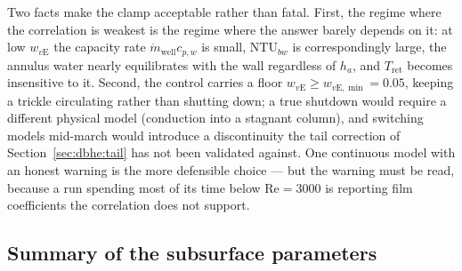 Two facts make the clamp acceptable rather than fatal. First, the regime where
the correlation is weakest is the regime where the answer barely depends on it:
at low $w_{v\mathrm{E}}$ the capacity rate $\dot m_{\mathrm{well}}c_{p,w}$ is
small, $\mathrm{NTU}_{bw}$ is correspondingly large, the annulus water nearly
equilibrates with the wall regardless of $h_a$, and $T_{\mathrm{ret}}$ becomes
insensitive to it. Second, the control carries a floor
$w_{v\mathrm{E}}\ge w_{v\mathrm{E},\min}=0.05$, keeping a trickle circulating
rather than shutting down; a true shutdown would require a different physical
model (conduction into a stagnant column), and switching models mid-march would
introduce a discontinuity the tail correction of
Section~\ref{sec:dbhe:tail} has not been validated against. One continuous model
with an honest warning is the more defensible choice --- but the warning must be
read, because a run spending most of its time below $\mathrm{Re}=3000$ is
reporting film coefficients the correlation does not support.

\subsection{Summary of the subsurface parameters}
\label{sec:dbhe:params}

